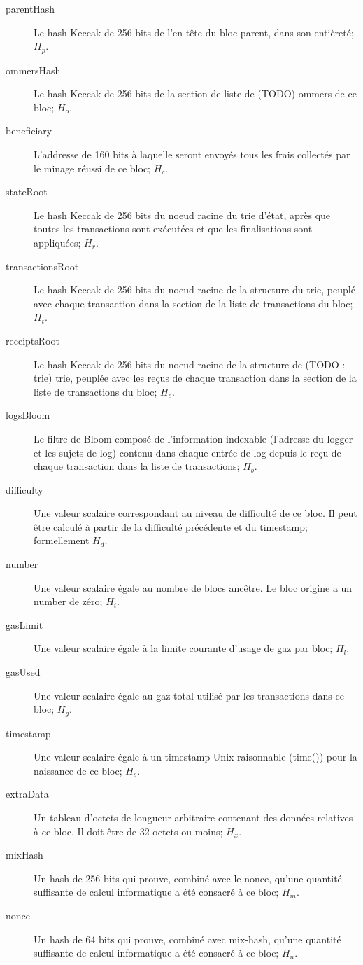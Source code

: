 \documentclass[9pt,oneside]{amsart}
\begin{document}
\begin{multicols}{2}
\begin{description}
\item[parentHash] Le hash Keccak de 256 bits de l'en-tête du bloc parent, dans son entièreté; $H_p$.
\item[ommersHash] Le hash Keccak de 256 bits de la section de liste de (TODO) ommers de ce bloc; $H_o$.
\item[beneficiary] L'addresse de 160 bits à laquelle seront envoyés tous les frais collectés par le minage réussi de ce bloc; $H_c$.
\item[stateRoot]  Le hash Keccak de 256 bits du noeud racine du trie d'état, après que toutes les transactions sont exécutées et que les finalisations sont appliquées; $H_r$.
\item[transactionsRoot] Le hash Keccak de 256 bits du noeud racine de la structure du trie, peuplé avec chaque transaction dans la section de la liste de transactions du bloc; $H_t$.
\item[receiptsRoot] Le hash Keccak de 256 bits du noeud racine de la structure de  (TODO : trie) trie, peuplée avec les reçus de chaque transaction dans la section de la liste de transactions du bloc; $H_e$.
\item[logsBloom] Le filtre de Bloom composé de l'information indexable (l'adresse du logger et les sujets de log) contenu dans chaque entrée de log depuis le reçu de chaque transaction dans la liste de transactions; $H_b$.
\item[difficulty] Une valeur scalaire correspondant au niveau de difficulté de ce bloc. Il peut être calculé à partir de la difficulté précédente et du timestamp; formellement $H_d$.
\item[number] Une valeur scalaire égale au nombre de blocs ancêtre. Le bloc origine a un number de zéro; $H_i$.
\item[gasLimit] Une valeur scalaire égale à la limite courante d'usage de gaz par bloc; $H_l$.
\item[gasUsed] Une valeur scalaire égale au gaz total utilisé par les transactions dans ce bloc; $H_g$.
\item[timestamp] Une valeur scalaire égale à un timestamp Unix raisonnable (time()) pour la naissance de ce bloc; $H_s$.
\item[extraData] Un tableau d'octets de longueur arbitraire contenant des données relatives à ce bloc. Il doit être de 32 octets ou moins; $H_x$.
\item[mixHash] Un hash de 256 bits qui prouve, combiné avec le nonce, qu'une quantité suffisante de calcul informatique a été consacré à ce bloc; $H_m$.
\item[nonce] Un hash de 64 bits qui prouve, combiné avec mix-hash, qu'une quantité suffisante de calcul informatique a été consacré à ce bloc; $H_n$.
\end{description}


\end{multicols}
\end{document}
